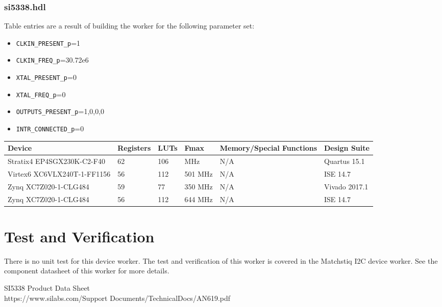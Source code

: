 \documentclass{article}
\def\comp{si5338}
\def\Comp{SI5338}
\begin{document}
\subsubsection*{\comp.hdl}
Table entries are a result of building the worker for the following parameter set:\
\begin{itemize}
	\item \verb+CLKIN_PRESENT_p+=1
	\item \verb+CLKIN_FREQ_p+=30.72e6
	\item \verb+XTAL_PRESENT_p+=0
	\item \verb+XTAL_FREQ_p+=0
	\item \verb+OUTPUTS_PRESENT_p+=1,0,0,0
	\item \verb+INTR_CONNECTED_p+=0
\end{itemize}
\begin{scriptsize}
	\begin{tabular}{|M{4.5cm}|M{1cm}|M{1cm}|M{1.5cm}|M{2cm}|M{2cm}|}
		\hline
		Device                      & Registers & LUTs & Fmax	& Memory/Special Functions 	& Design Suite    	\\
		\hline
		Stratix4 EP4SGX230K-C2-F40  & 62        & 106  & MHz 	& N/A                    	& Quartus 15.1 	\\
		\hline
		Virtex6 XC6VLX240T-1-FF1156 & 56        & 112  & 501 MHz& N/A                       & ISE 14.7        	\\
		\hline
		Zynq XC7Z020-1-CLG484       & 59       	& 77  & 350 MHz& N/A                      	& Vivado 2017.1        	\\
		\hline
		Zynq XC7Z020-1-CLG484       & 56       	& 112  & 644 MHz& N/A                      	& ISE 14.7        	\\
		\hline
	\end{tabular}
\end{scriptsize}

\section*{Test and Verification}
There is no unit test for this device worker. The test and verification of this worker is covered in the Matchstiq I2C device worker. See the component datasheet of this worker for more details.
  \begin{thebibliography}{1}

   \Comp{} Product Data Sheet\\
  https://www.silabs.com/Support Documents/TechnicalDocs/AN619.pdf

  \end{thebibliography}
\end{document}
